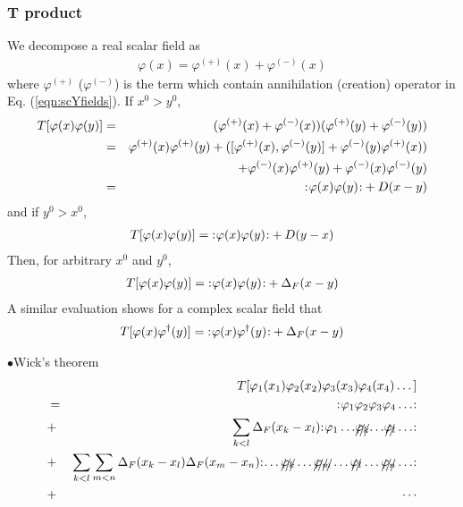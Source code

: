 \subsubsection{T product}
We decompose a real scalar field as 
\begin{eqnarray}
\varphi(x) = \varphi^{(+)}(x) + \varphi^{(-)}(x)
\end{eqnarray}
where $\varphi^{(+)}$ ($\varphi^{(-)}$) is the term which contain
annihilation (creation) operator in Eq. (\ref{eqn:scYfields}).
If $x^0 > y^0$,
\begin{eqnarray}
T[ \varphi(x) \varphi(y)]
&=& (\varphi^{(+)}(x) + \varphi^{(-)}(x))(\varphi^{(+)}(y) + \varphi^{(-)}(y))
\nonumber\\
&=&
\varphi^{(+)}(x) \varphi^{(+)}(y)
+
( [\varphi^{(+)}(x), \varphi^{(-)}(y)] 
+ \varphi^{(-)}(y) \varphi^{(+)}(x) )
\nonumber\\
&&
+
\varphi^{(-)}(x) \varphi^{(+)}(y)
+
\varphi^{(-)}(x) \varphi^{(-)}(y)
\nonumber\\
&=&
{:\mathrel{\mspace{1mu}\varphi(x) \varphi(y)\mspace{1mu}}:} + D(x-y)
\nonumber
\end{eqnarray}
and if $y^0 > x^0$,
\begin{eqnarray}
T[ \varphi(x) \varphi(y)]
=
{:\mathrel{\mspace{1mu}\varphi(x) \varphi(y)\mspace{1mu}}:} + D(y-x)
\nonumber
\end{eqnarray}
Then, for arbitrary $x^0$ and $y^0$,
\begin{eqnarray}
T[ \varphi(x) \varphi(y)]
=
{:\mathrel{\mspace{1mu}\varphi(x) \varphi(y)\mspace{1mu}}:} + \Delta_F(x-y)
\end{eqnarray}
A similar evaluation shows for a complex scalar field that
\begin{eqnarray}
T[ \varphi(x) \varphi^\dagger(y)]
=
{:\mathrel{\mspace{1mu}\varphi(x) \varphi^\dagger(y)\mspace{1mu}}:} + \Delta_F(x-y)
\end{eqnarray}

\noindent
$\bullet$Wick's theorem\\
\begin{eqnarray}
&&T[\varphi_1(x_1) \varphi_2(x_2) \varphi_3(x_3) \varphi_4(x_4) \dots]
\nonumber\\
&=& \normalprod{\varphi_1 \varphi_2 \varphi_3 \varphi_4 \dots}
\nonumber\\
&+&
\sum_{k<l} \Delta_F(x_k - x_l)
\normalprod{
{\varphi_1\dots}{\xout{\varphi_k}}{\dots}{\xout{\varphi_l}} \dots
}%
\nonumber\\
&+&
\sum_{k<l} \sum_{m<n} \Delta_F(x_k - x_l) \Delta_F(x_m - x_n)
\normalprod{\dots \xout{\varphi_k} \dots \xout{\varphi_m} \dots \xout{\varphi_l} \dots
\xout{\varphi_n} \dots}
\nonumber\\
&+& \cdots
\label{eqn:WickTheorem}
\end{eqnarray}

